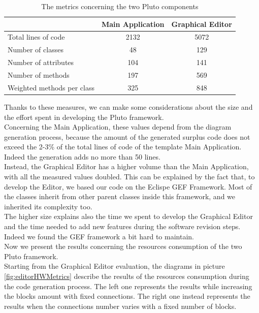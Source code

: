 \begin{table}[htdp]
\centering
\begin{tabular}{|l|c|c|}
\hline
& Main Application & Graphical Editor \\
\hline
Total lines of code & 2132 & 5072 \\
\hline
Number of classes & 48 & 129 \\
\hline
Number of attributes & 104 & 141 \\
\hline
Number of methods & 197 & 569 \\
\hline
Weighted methods per class & 325 & 848 \\
\hline
\end{tabular}
\caption{The metrics concerning the two Pluto components}
\label{table:metricsTable}
\end{table}

Thanks to these measures, we can make some considerations about the size and the effort	spent in developing the Pluto framework.
\\
Concerning the Main Application, these values depend from the diagram generation process, because the amount of the generated surplus code does not exceed the 2-3\% of the total lines of code of the template Main Application.
Indeed the generation adds no more than 50 lines.
\\
Instead, the Graphical Editor has a higher volume than the Main Application, with all the measured values doubled. 
This can be explained by the fact that, to develop the Editor, we based our code on the Eclispe GEF Framework.
Most of the classes inherit from other parent classes inside this framework, and we inherited its complexity too.
\\
The higher size explains also the time we spent to develop the Graphical Editor and the time needed to add new features during the software revision steps.
Indeed we found the GEF framework a bit hard to maintain.
\\

Now we present the results concerning the resources consumption of the two Pluto framework.
\\
Starting from the Graphical Editor evaluation, the diagrams in picture \ref{fig:editorHWMetrics} describe the results of the resources consumption during the code generation process.
The left one represents the results while increasing the blocks amount with fixed connections.
The right one instead represents the results when the connections number varies with a fixed number of blocks.
\\

